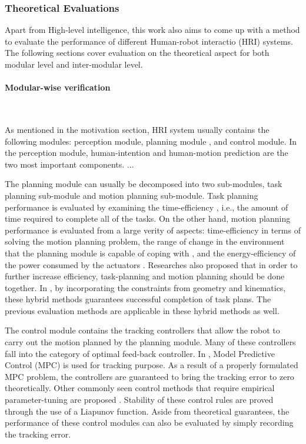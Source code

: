 \subsubsection{Theoretical Evaluations}

Apart from High-level intelligence, this work also aims to come up with a method to evaluate the performance of different Human-robot interactio (HRI) systems. The following sections cover evaluation on the theoretical aspect for both modular level and inter-modular level. 

\paragraph{Modular-wise verification}~

As mentioned in the motivation section, HRI system usually contains the following modules: perception module, planning module , and control module. In the perception module, human-intention and human-motion prediction are the two most important components. ... 

The planning module can usually be decomposed into two sub-modules, task planning sub-module and motion planning sub-module. Task planning performance is evaluated by examining the time-efficiency \cite{foster1999influence}, i.e., the amount of time required to complete all of the tasks. On the other hand, motion planning performance is evaluated from a large verity of aspects: time-efficiency in terms of solving the motion planning problem, the range of change in the environment that the planning module is capable of coping with \cite{ratliff2009chomp}, and the energy-efficiency of the power consumed by the actuators \cite{mei2004energy}. Researches also proposed that in order to further increase efficiency, task-planning and motion planning should be done together. In \cite{garrett2015ffrob,mahmoudzadeh2016toward}, by incorporating the constraints from geometry and kinematics, these hybrid methods guarantees successful completion of task plans. The previous evaluation methods are applicable in these hybrid methods as well.  

The control module contains the tracking controllers that allow the robot to carry out the motion planned by the planning module. Many of these controllers fall into the category of optimal feed-back controller. In \cite{kanjanawanishkul2009path, falcone2007predictive}, Model Predictive Control (MPC) is used for tracking purpose. As a result of a properly formulated MPC problem, the controllers are guaranteed to bring the tracking error to zero theoretically. Other commonly seen control methods that require empirical parameter-tuning are proposed \cite{kanayama1990stable, xian2004, niu2013barrier}. Stability of these control rules are proved through the use of a Liapunov function. Aside from theoretical guarantees, the performance of these control modules can also be evaluated by simply recording the tracking error.

